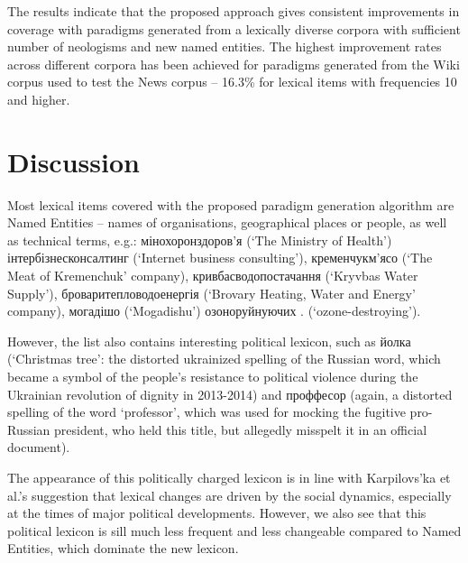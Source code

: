 \documentclass[11pt,a4paper]{article}
\begin{document}
The results indicate that the proposed approach gives consistent improvements in coverage with paradigms generated from a lexically diverse corpora with sufficient number of neologisms and new named entities. The highest improvement rates across different corpora has been achieved for paradigms generated from the Wiki corpus used to test the News corpus -- 16.3\% for lexical items with frequencies 10 and higher.


\section{Discussion}
\label{sec:Discussion}

Most lexical items covered with the proposed paradigm generation algorithm are Named Entities -- names of organisations, geographical places or people, as well as technical terms, e.g.: мінохоронздоров'я  (`The Ministry of Health') 
інтербізнесконсалтинг  (`Internet business consulting'), кременчукм'ясо  (`The Meat of Kremenchuk' company), кривбасводопостачання  (`Kryvbas Water Supply'), броваритепловодоенергія  (`Brovary Heating, Water and Energy' company), могадішо  (`Mogadishu')
озоноруйнуючих . (`ozone-destroying'). 

However, the list also contains interesting political lexicon, such as йолка  (`Christmas tree': the distorted ukrainized spelling of the Russian word, which became a symbol of the people's resistance to political violence during the Ukrainian revolution of dignity in 2013-2014) and проффесор  (again, a distorted spelling of the word `professor', which was used for mocking the fugitive pro-Russian president, who held this title, but allegedly misspelt it in an official document). 

The appearance of this politically charged lexicon is in line with Karpilovs'ka et al.'s  suggestion that lexical changes are driven by the social dynamics, especially at the times of major political developments. However, we also see that this political lexicon is sill much less frequent and less changeable compared to Named Entities, which dominate the new lexicon.
\end{document}
